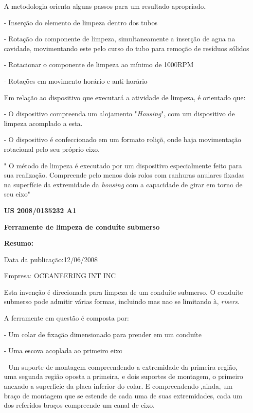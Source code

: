 \documentclass[a4paper,12pt]{article}
\begin{document}
 A metodologia orienta alguns passos para um resultado apropriado.
 
 - Inserção do elemento de limpeza dentro dos tubos
 
 - Rotação do componente de limpeza, simultaneamente a inserção de agua na cavidade, movimentando este pelo curso do tubo para remoção de resíduos sólidos
 
 - Rotacionar o componente de limpeza ao mínimo de 1000RPM
 
 - Rotações em movimento horário e anti-horário
 
 Em relação ao dispositivo que executará a atividade de limpeza, é orientado que:
 
 - O dispositivo compreenda um alojamento "\textit{Housing}", com um dispositivo de limpeza acomplado a esta.
 
 - O dispositivo é confeccionado em um formato roliçõ, onde haja movimentação rotacional pelo seu próprio eixo.
 
  " 
O método de limpeza é executado por um dispositivo especialmente
 feito para sua realização. Compreende pelo menos dois rolos
 com ranhuras anulares fixadas na superfície da extremidade da
\textit{housing} com a capacidade de girar em torno de seu eixo"


\vspace{1,0cm}
 \begin{center}
  \textbf{US 2008/0135232 A1} 
 
 \textbf{Ferramente de limpeza de conduíte submerso}
 \end{center}
 
 \textbf{Resumo:}
 
 Data da publicação:12/06/2008
 
 Empresa: OCEANEERING INT INC
 
 \vspace{1,0cm}
 
 Esta invenção é direcionada para limpeza de um conduíte submerso. O conduíte submerso pode admitir várias formas, incluindo mas nao se limitando à, \textit{risers}.
 
 A ferramente em questão é composta por:
 
 - Um colar de fixação dimensionado para prender em um conduíte
 
 - Uma escova acoplada ao primeiro eixo
 
 - Um suporte de montagem compreendendo a extremidade da primeira região, uma segunda região oposta a primeira, e dois suportes de montagem, o primeiro anexado a superficie da placa inferior do colar. E  compreendendo ,ainda, um braço de montagem que se estende de cada uma de suas extremidades, cada um dos referidos braços compreende um canal de eixo.
 
\end{document}
